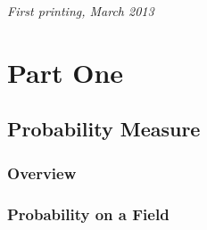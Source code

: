 \documentclass[11pt,fleqn]{book} %
\begin{document}
\noindent \textit{First printing, March 2013} %



\pagestyle{empty} %

\tableofcontents %

\cleardoublepage %

\pagestyle{fancy} %


\part{Part One}



\chapter{Probability Measure}



\section{Overview}


	




\section{Probability on a Field}
\end{document}
